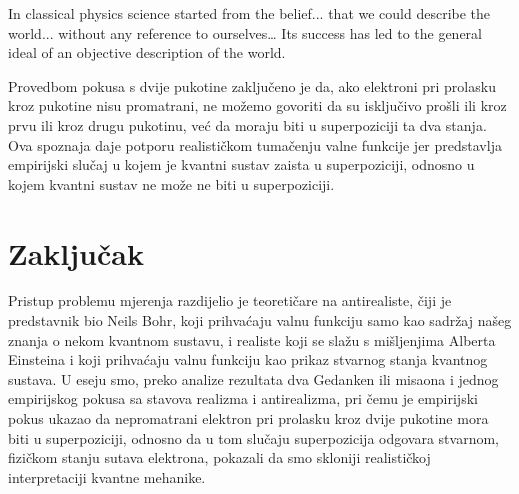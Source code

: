 \documentclass[twoside]{article}
\begin{document}
\begin{displayquote}
In classical physics science started from the belief... that we could describe the world... without any reference to ourselves… Its success has led to the general ideal of an objective description of the world.\cite{Heisenberg1958}
\end{displayquote}

\noindent
Provedbom pokusa s dvije pukotine zaključeno je da, ako elektroni pri prolasku kroz pukotine nisu promatrani, ne možemo govoriti da su isključivo prošli ili kroz prvu ili kroz drugu pukotinu, već da moraju biti u superpoziciji ta dva stanja. Ova spoznaja daje potporu realističkom tumačenju valne funkcije jer predstavlja empirijski slučaj u kojem je kvantni sustav zaista u superpoziciji, odnosno u kojem kvantni sustav ne može ne biti u superpoziciji.

\section{Zaključak}
Pristup problemu mjerenja razdijelio je teoretičare na antirealiste, čiji je predstavnik bio Neils Bohr, koji prihvaćaju valnu funkciju samo kao sadržaj našeg znanja o nekom kvantnom sustavu, i realiste koji se slažu s mišljenjima Alberta Einsteina i koji prihvaćaju valnu funkciju kao prikaz stvarnog stanja kvantnog sustava. U eseju smo, preko analize rezultata dva Gedanken ili misaona i jednog empirijskog pokusa sa stavova realizma i antirealizma, pri čemu je empirijski pokus ukazao da nepromatrani elektron pri prolasku kroz dvije pukotine mora biti u superpoziciji, odnosno da u tom slučaju superpozicija odgovara stvarnom, fizičkom stanju sutava elektrona, pokazali da smo skloniji realističkoj interpretaciji kvantne mehanike.

\nocite{*}
 

\end{document}
